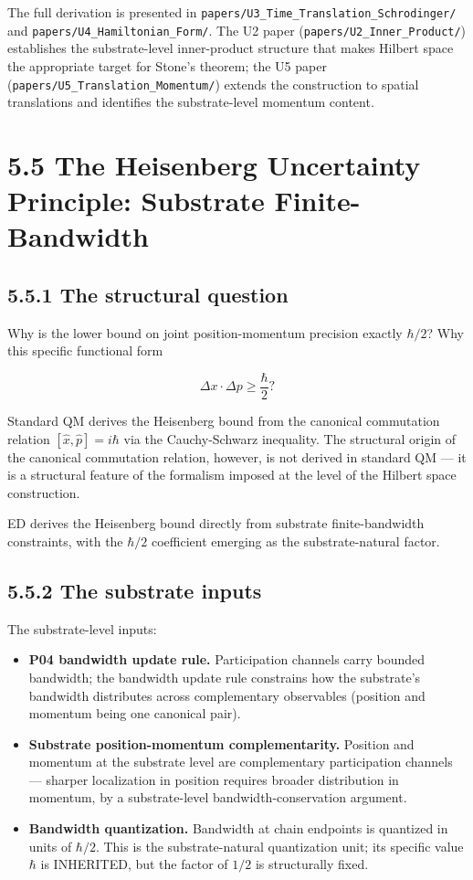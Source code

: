 \documentclass[11pt]{book}
\begin{document}
The full derivation is presented in \texttt{papers/U3\_Time\_Translation\_Schrodinger/} and \texttt{papers/U4\_Hamiltonian\_Form/}. The U2 paper (\texttt{papers/U2\_Inner\_Product/}) establishes the substrate-level inner-product structure that makes Hilbert space the appropriate target for Stone's theorem; the U5 paper (\texttt{papers/U5\_Translation\_Momentum/}) extends the construction to spatial translations and identifies the substrate-level momentum content.

\section{5.5 The Heisenberg Uncertainty Principle: Substrate Finite-Bandwidth}

\subsection{5.5.1 The structural question}

Why is the lower bound on joint position-momentum precision exactly $\hbar/2$? Why this specific functional form

\[
\Delta x \cdot \Delta p \geq \frac{\hbar}{2}?
\]

Standard QM derives the Heisenberg bound from the canonical commutation relation $[\hat x, \hat p] = i\hbar$ via the Cauchy-Schwarz inequality. The structural origin of the canonical commutation relation, however, is not derived in standard QM — it is a structural feature of the formalism imposed at the level of the Hilbert space construction.

ED derives the Heisenberg bound directly from substrate finite-bandwidth constraints, with the $\hbar/2$ coefficient emerging as the substrate-natural factor.

\subsection{5.5.2 The substrate inputs}

The substrate-level inputs:

\begin{itemize}
\item \textbf{P04 bandwidth update rule.} Participation channels carry bounded bandwidth; the bandwidth update rule constrains how the substrate's bandwidth distributes across complementary observables (position and momentum being one canonical pair).
\item \textbf{Substrate position-momentum complementarity.} Position and momentum at the substrate level are complementary participation channels — sharper localization in position requires broader distribution in momentum, by a substrate-level bandwidth-conservation argument.
\item \textbf{Bandwidth quantization.} Bandwidth at chain endpoints is quantized in units of $\hbar/2$. This is the substrate-natural quantization unit; its specific value $\hbar$ is INHERITED, but the factor of $1/2$ is structurally fixed.
\end{itemize}
\end{document}
